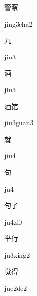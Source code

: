 \begin{verbete}{警察}
\begin{pronuncia}{jing3cha2}
\end{pronuncia}
\end{verbete}

\begin{verbete}[jiu3]{九}
\begin{pronuncia}{jiu3}
\end{pronuncia}
\end{verbete}

\begin{verbete}[jiu3]{酒}
\begin{pronuncia}{jiu3}
\end{pronuncia}
\end{verbete}

\begin{verbete}{酒馆}
\begin{pronuncia}{jiu3guan3}
\end{pronuncia}
\end{verbete}

\begin{verbete}[jiu4]{就}
\begin{pronuncia}{jiu4}
\end{pronuncia}
\end{verbete}

\begin{verbete}[ju4]{句}
\begin{pronuncia}{ju4}
\end{pronuncia}
\end{verbete}

\begin{verbete}[ju4zi0]{句子}
\begin{pronuncia}{ju4zi0}
\end{pronuncia}
\end{verbete}

\begin{verbete}[ju3xing2]{举行}
\begin{pronuncia}{ju3xing2}
\end{pronuncia}
\end{verbete}

\begin{verbete}[jue2de2]{觉得}
\begin{pronuncia}{jue2de2}
\end{pronuncia}
\end{verbete}

